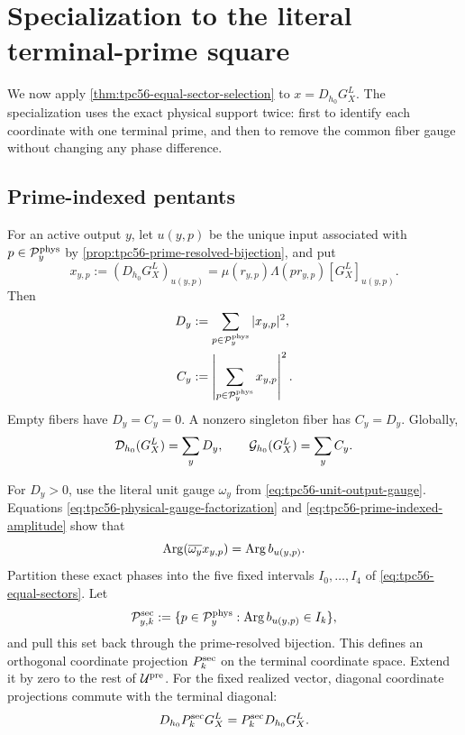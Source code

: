 \section{Specialization to the literal terminal-prime square}
\label{sec:physical-specialization}

We now apply \cref{thm:tpc56-equal-sector-selection} to
\(x=D_{h_0}G_X^L\).  The specialization uses the exact physical support
twice: first to identify each coordinate with one terminal prime, and then
to remove the common fiber gauge without changing any phase difference.

\subsection{Prime-indexed pentants}

For an active output \(y\), let \(u(y,p)\) be the unique input associated
with \(p\in\mathcal P_y^{\rm phys}\) by
\cref{prop:tpc56-prime-resolved-bijection}, and put
\begin{equation}
 x_{y,p}
 :=(D_{h_0}G_X^L)_{u(y,p)}
 =\mu(r_{y,p})\Lambda(p r_{y,p})
   [G_X^L]_{u(y,p)}.
 \label{eq:tpc56-prime-indexed-amplitude}
\end{equation}
Then
\begin{align}
 D_y&:=\sum_{p\in\mathcal P_y^{\rm phys}}|x_{y,p}|^2,
 \label{eq:tpc56-fiber-diagonal}\\
 C_y&:=\left|\sum_{p\in\mathcal P_y^{\rm phys}}x_{y,p}\right|^2.
 \label{eq:tpc56-fiber-coherent-square}
\end{align}
Empty fibers have \(D_y=C_y=0\).  A nonzero singleton fiber has
\(C_y=D_y\).  Globally,
\begin{equation}
 \mathcal D_{h_0}(G_X^L)=\sum_yD_y,
 \qquad
 \mathcal G_{h_0}(G_X^L)=\sum_yC_y.
 \label{eq:tpc56-global-prime-square}
\end{equation}

For \(D_y>0\), use the literal unit gauge \(\omega_y\) from
\eqref{eq:tpc56-unit-output-gauge}.  Equations
\eqref{eq:tpc56-physical-gauge-factorization} and
\eqref{eq:tpc56-prime-indexed-amplitude} show that
\begin{equation}
 \operatorname{Arg}(\overline{\omega_y}x_{y,p})
 =\operatorname{Arg} b_{u(y,p)}.
 \label{eq:tpc56-normalized-literal-phase}
\end{equation}
Partition these exact phases into the five fixed intervals
\(I_0,\ldots,I_4\) of \eqref{eq:tpc56-equal-sectors}.  Let
\begin{equation}
 \mathcal P_{y,k}^{\rm sec}
 :=\{p\in\mathcal P_y^{\rm phys}:
     \operatorname{Arg} b_{u(y,p)}\in I_k\},
 \label{eq:tpc56-prime-pentants}
\end{equation}
and pull this set back through the prime-resolved bijection.  This defines
an orthogonal coordinate projection \(P_k^{\rm sec}\) on the terminal
coordinate space.  Extend it by zero to the rest of \(\mathcal U^{\rm pre}\).
For the fixed realized vector, diagonal coordinate projections commute
with the terminal diagonal:
\begin{equation}
 D_{h_0}P_k^{\rm sec}G_X^L
 =P_k^{\rm sec}D_{h_0}G_X^L.
 \label{eq:tpc56-selector-commutation}
\end{equation}

